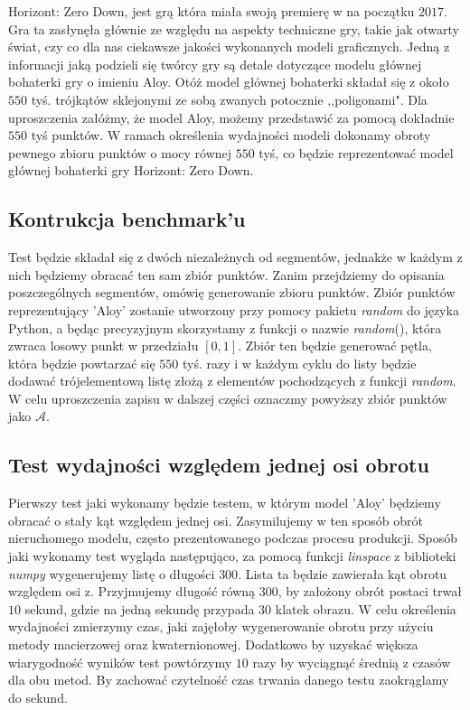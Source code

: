 \documentclass[a4paper,twoside,11pt,reqno]{mwrep}
\theoremstyle{plain} \newtheorem{twr}{Twierdzenie}
\theoremstyle{plain} \newtheorem{lem}{Lemat}
\theoremstyle{definition} \newtheorem{defi}{Definicja}
\theoremstyle{remark} \newtheorem*{wni}{Wniosek}
\theoremstyle{definition} \newtheorem{uwaga}{Uwaga}
\theoremstyle{definition}\newtheorem{prz}{Przykład}
\begin{document}
Horizont: Zero Down, jest grą która miała swoją premierę w na początku $2017$. Gra ta zasłynęła głównie ze względu na aspekty 
techniczne gry, takie jak otwarty świat, czy co 
dla nas ciekawsze jakości wykonanych modeli graficznych. Jedną z informacji jaką podzieli się twórcy gry
są detale dotyczące modelu głównej bohaterki gry o imieniu Aloy. Otóż model głównej bohaterki składał się 
z około $550$ tyś. trójkątów sklejonymi ze sobą zwanych potocznie ,,poligonami". 
Dla uproszczenia załóżmy, że model Aloy, możemy przedstawić za pomocą dokładnie $550$ tyś punktów.
W ramach określenia wydajności modeli dokonamy obroty pewnego zbioru punktów o mocy równej $550$ tyś, co
będzie reprezentować model głównej bohaterki gry Horizont: Zero Down.  
\subsection{Kontrukcja benchmark'u}
Test będzie składał się z dwóch niezależnych od segmentów, jednakże w każdym z nich będziemy obracać 
ten sam zbiór punktów. Zanim przejdziemy do opisania poszczególnych segmentów, omówię 
generowanie zbioru punktów.
Zbiór punktów reprezentujący 'Aloy' zostanie utworzony przy pomocy pakietu 
\textit{random} do języka Python, a będąc precyzyjnym skorzystamy z funkcji o nazwie \textit{random}(),
która zwraca losowy punkt w przedziału $[0,1]$. 
Zbiór ten będzie generować pętla, która będzie powtarzać się $550$ tyś. razy i w każdym cyklu do 
listy będzie dodawać trójelementową listę złożą z elementów pochodzących z funkcji \textit{random}.
W celu uproszczenia zapisu w dalszej części oznaczmy powyższy zbiór punktów jako $\mathcal{A}$.
\subsection*{Test wydajności względem jednej osi obrotu}
Pierwszy test jaki wykonamy będzie testem, w którym model 'Aloy' będziemy obracać o stały kąt względem jednej osi. Zasymilujemy w ten sposób obrót nieruchomego modelu, często prezentowanego podczas
procesu produkcji. Sposób jaki wykonamy test wygląda następująco, za pomocą funkcji \textit{linspace} 
z biblioteki \textit{numpy} wygenerujemy listę o długości $300$. Lista ta będzie zawierała kąt obrotu 
względem osi z. Przyjmujemy długość równą $300$, by założony obrót postaci trwał $10$ sekund, gdzie na
jedną sekundę przypada $30$ klatek obrazu. W celu określenia wydajności zmierzymy czas, jaki zajęłoby
wygenerowanie obrotu przy użyciu metody macierzowej oraz kwaternionowej. Dodatkowo by uzyskać większa
wiarygodność wyników test powtórzymy $10$ razy by wyciągnąć średnią z czasów dla obu metod.
By zachować czytelność czas trwania danego testu zaokrąglamy do sekund.\\
\end{document}
